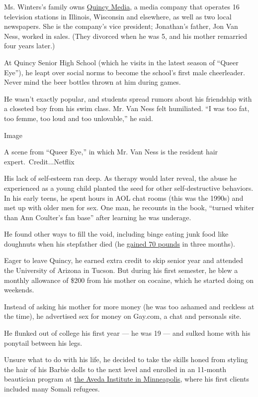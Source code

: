 Ms. Winters's family owns \href{https://quincymediacareers.com}{Quincy
Media}, a media company that operates 16 television stations in
Illinois, Wisconsin and elsewhere, as well as two local newspapers. She
is the company's vice president; Jonathan's father, Jon Van Ness, worked
in sales. (They divorced when he was 5, and his mother remarried four
years later.)

At Quincy Senior High School (which he visits in the latest season of
``Queer Eye''), he leapt over social norms to become the school's first
male cheerleader. Never mind the beer bottles thrown at him during
games.

He wasn't exactly popular, and students spread rumors about his
friendship with a closeted boy from his swim class. Mr. Van Ness felt
humiliated. ``I was too fat, too femme, too loud and too unlovable,'' he
said.

Image

A scene from ``Queer Eye,'' in which Mr. Van Ness is the resident hair
expert.~Credit...Netflix

His lack of self-esteem ran deep. As therapy would later reveal, the
abuse he experienced as a young child planted the seed for other
self-destructive behaviors. In his early teens, he spent hours in AOL
chat rooms (this was the 1990s) and met up with older men for sex. One
man, he recounts in the book, ``turned whiter than Ann Coulter's fan
base'' after learning he was underage.

He found other ways to fill the void, including binge eating junk food
like doughnuts when his stepfather died (he
\href{https://www.instagram.com/p/BhsBoWwhQtt/?utm_source=ig_embed}{gained
70 pounds} in three months).

Eager to leave Quincy, he earned extra credit to skip senior year and
attended the University of Arizona in Tucson. But during his first
semester, he blew a monthly allowance of \$200 from his mother on
cocaine, which he started doing on weekends.

Instead of asking his mother for more money (he was too ashamed and
reckless at the time), he advertised sex for money on Gay.com, a chat
and personals site.

He flunked out of college his first year --- he was 19 --- and sulked
home with his ponytail between his legs.

Unsure what to do with his life, he decided to take the skills honed
from styling the hair of his Barbie dolls to the next level and enrolled
in an 11-month beautician program at
\href{https://aveda.edu/locations/location/minneapolis-mn/}{the Aveda
Institute in Minneapolis}, where his first clients included many Somali
refugees.

